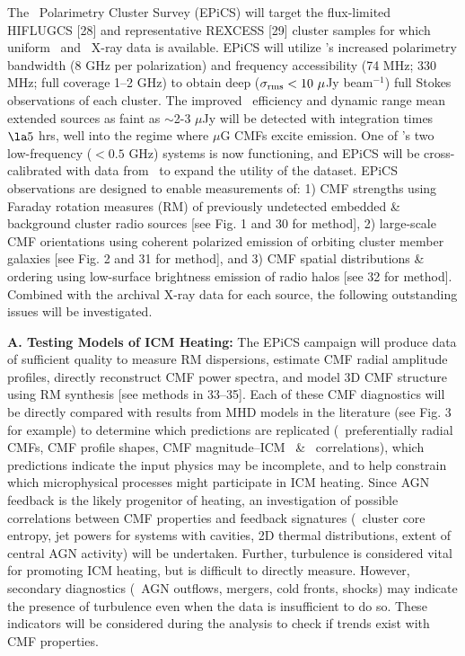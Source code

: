 \documentclass[letterpaper,11pt]{article}
\begin{document}
The \evla\ Polarimetry Cluster Survey (EPiCS) will target the
flux-limited HIFLUGCS [28] and representative REXCESS [29] cluster
samples for which uniform \chandra\ and \xmm\ X-ray data is
available. EPiCS will utilize \evla's increased polarimetry bandwidth
(8 GHz per polarization) and frequency accessibility (74 MHz; 330 MHz;
full coverage 1--2 GHz) to obtain deep ($\sigma_{\rm{rms}} < 10
~\mu$Jy beam$^{-1}$) full Stokes observations of each cluster. The
improved \evla\ efficiency and dynamic range mean extended sources as
faint as $\sim$2-3 $\mu$Jy will be detected with integration times
$\la 5$ hrs, well into the regime where $\mu$G CMFs excite
emission. One of \evla's two low-frequency ($< 0.5$ GHz) systems is
now functioning, and EPiCS will be cross-calibrated with data from
\lofar\ to expand the utility of the dataset. EPiCS observations are
designed to enable measurements of: 1) CMF strengths using Faraday
rotation measures (RM) of previously undetected embedded \& background
cluster radio sources [see Fig. 1 and 30 for method], 2) large-scale
CMF orientations using coherent polarized emission of orbiting cluster
member galaxies [see Fig. 2 and 31 for method], and 3) CMF spatial
distributions \& ordering using low-surface brightness emission of
radio halos [see 32 for method]. Combined with the archival X-ray data
for each source, the following outstanding issues will be
investigated.

{\bf{A. Testing Models of ICM Heating:}} The EPiCS campaign will
produce data of sufficient quality to measure RM dispersions, estimate
CMF radial amplitude profiles, directly reconstruct CMF power spectra,
and model 3D CMF structure using RM synthesis [see methods in
  33--35]. Each of these CMF diagnostics will be directly compared
with results from MHD models in the literature (see Fig. 3 for
example) to determine which predictions are replicated
(\eg\ preferentially radial CMFs, CMF profile shapes, CMF
magnitude--ICM \nelec\ \& \tx\ correlations), which predictions
indicate the input physics may be incomplete, and to help constrain
which microphysical processes might participate in ICM heating. Since
AGN feedback is the likely progenitor of heating, an investigation of
possible correlations between CMF properties and feedback signatures
(\eg\ cluster core entropy, jet powers for systems with cavities, 2D
thermal distributions, extent of central AGN activity) will be
undertaken. Further, turbulence is considered vital for promoting ICM
heating, but is difficult to directly measure. However, secondary
diagnostics (\eg\ AGN outflows, mergers, cold fronts, shocks) may
indicate the presence of turbulence even when the data is insufficient
to do so. These indicators will be considered during the analysis to
check if trends exist with CMF properties.
\end{document}
